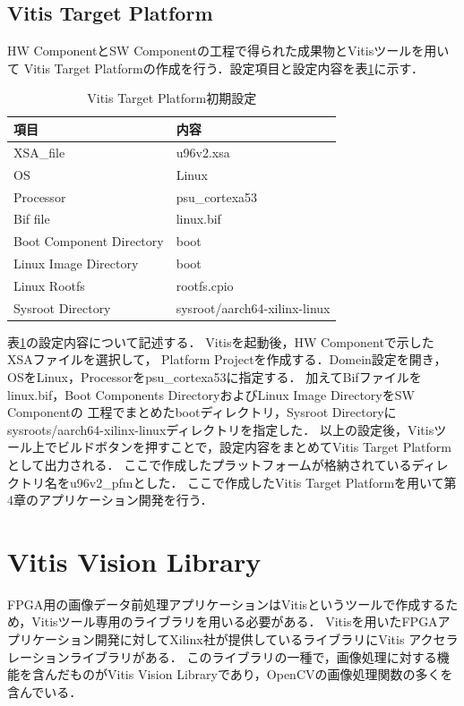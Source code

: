 \documentclass[11pt,a4j]{jreport}
\begin{document}
\subsection{Vitis Target Platform}
HW ComponentとSW Componentの工程で得られた成果物とVitisツールを用いて
Vitis Target Platformの作成を行う．設定項目と設定内容を表\ref{vtpset}に示す．
\begin{table}[H]
  \caption{Vitis Target Platform初期設定}
  \label{vtpset}
  \centering
  \begin{tabular}{ll}
    \hline
    項目 & 内容 \\
    \hline
    XSA_file & u96v2.xsa\\
    OS & Linux \\
    Processor & psu_cortexa53\\
    Bif file & linux.bif \\
    Boot Component Directory & boot \\
    Linux Image Directory & boot \\
    Linux Rootfs & rootfs.cpio \\
    Sysroot Directory & sysroot/aarch64-xilinx-linux \\
    \hline
    \end{tabular}
\end{table}
表\ref{vtpset}の設定内容について記述する．
Vitisを起動後，HW Componentで示したXSAファイルを選択して，
Platform Projectを作成する．Domein設定を開き，OSをLinux，Processorをpsu_cortexa53に指定する．
加えてBifファイルをlinux.bif，Boot Components DirectoryおよびLinux Image DirectoryをSW Componentの
工程でまとめたbootディレクトリ，Sysroot Directoryにsysroots/aarch64-xilinx-linuxディレクトリを指定した．
以上の設定後，Vitisツール上でビルドボタンを押すことで，設定内容をまとめてVitis Target Platformとして出力される．
ここで作成したプラットフォームが格納されているディレクトリ名をu96v2_pfmとした．
ここで作成したVitis Target Platformを用いて第4章のアプリケーション開発を行う．

\section{Vitis Vision Library}
FPGA用の画像データ前処理アプリケーションはVitisというツールで作成するため，Vitisツール専用のライブラリを用いる必要がある．
Vitisを用いたFPGAアプリケーション開発に対してXilinx社が提供しているライブラリにVitis アクセラレーションライブラリがある．
このライブラリの一種で，画像処理に対する機能を含んだものがVitis Vision Libraryであり，OpenCVの画像処理関数の多くを含んでいる．
\end{document}
